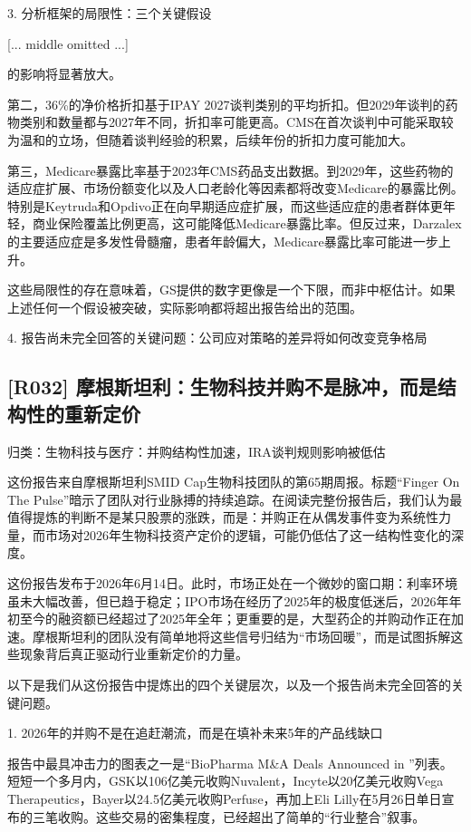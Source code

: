 \documentclass[11pt]{ctexart}
\begin{document}
3. 分析框架的局限性：三个关键假设

[... middle omitted ...]

的影响将显著放大。

第二，36\%的净价格折扣基于IPAY 2027谈判类别的平均折扣。但2029年谈判的药物类别和数量都与2027年不同，折扣率可能更高。CMS在首次谈判中可能采取较为温和的立场，但随着谈判经验的积累，后续年份的折扣力度可能加大。

第三，Medicare暴露比率基于2023年CMS药品支出数据。到2029年，这些药物的适应症扩展、市场份额变化以及人口老龄化等因素都将改变Medicare的暴露比例。特别是Keytruda和Opdivo正在向早期适应症扩展，而这些适应症的患者群体更年轻，商业保险覆盖比例更高，这可能降低Medicare暴露比率。但反过来，Darzalex的主要适应症是多发性骨髓瘤，患者年龄偏大，Medicare暴露比率可能进一步上升。

这些局限性的存在意味着，GS提供的数字更像是一个下限，而非中枢估计。如果上述任何一个假设被突破，实际影响都将超出报告给出的范围。

4. 报告尚未完全回答的关键问题：公司应对策略的差异将如何改变竞争格局

\subsection{[R032] 摩根斯坦利：生物科技并购不是脉冲，而是结构性的重新定价}
{\small\color{refgray}归类：生物科技与医疗：并购结构性加速，IRA谈判规则影响被低估}

这份报告来自摩根斯坦利SMID Cap生物科技团队的第65期周报。标题“Finger On The Pulse”暗示了团队对行业脉搏的持续追踪。在阅读完整份报告后，我们认为最值得提炼的判断不是某只股票的涨跌，而是：并购正在从偶发事件变为系统性力量，而市场对2026年生物科技资产定价的逻辑，可能仍低估了这一结构性变化的深度。

这份报告发布于2026年6月14日。此时，市场正处在一个微妙的窗口期：利率环境虽未大幅改善，但已趋于稳定；IPO市场在经历了2025年的极度低迷后，2026年年初至今的融资额已经超过了2025年全年；更重要的是，大型药企的并购动作正在加速。摩根斯坦利的团队没有简单地将这些信号归结为“市场回暖”，而是试图拆解这些现象背后真正驱动行业重新定价的力量。

以下是我们从这份报告中提炼出的四个关键层次，以及一个报告尚未完全回答的关键问题。

1. 2026年的并购不是在追赶潮流，而是在填补未来5年的产品线缺口

报告中最具冲击力的图表之一是“BioPharma M\&A Deals Announced in ”列表。短短一个多月内，GSK以106亿美元收购Nuvalent，Incyte以20亿美元收购Vega Therapeutics，Bayer以24.5亿美元收购Perfuse，再加上Eli Lilly在5月26日单日宣布的三笔收购。这些交易的密集程度，已经超出了简单的“行业整合”叙事。
\end{document}
